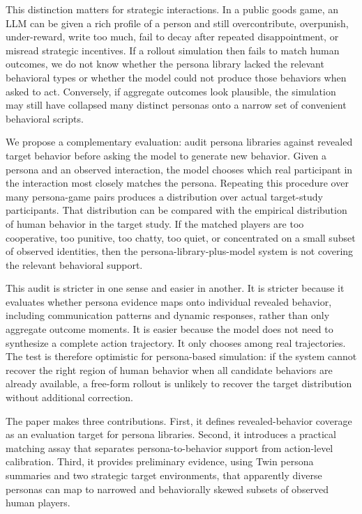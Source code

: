 \documentclass[11pt]{article}
\begin{document}
This distinction matters for strategic interactions. In a public goods game, an LLM can be given a rich profile of a person and still overcontribute, overpunish, under-reward, write too much, fail to decay after repeated disappointment, or misread strategic incentives. If a rollout simulation then fails to match human outcomes, we do not know whether the persona library lacked the relevant behavioral types or whether the model could not produce those behaviors when asked to act. Conversely, if aggregate outcomes look plausible, the simulation may still have collapsed many distinct personas onto a narrow set of convenient behavioral scripts.

We propose a complementary evaluation: audit persona libraries against revealed target behavior before asking the model to generate new behavior. Given a persona and an observed interaction, the model chooses which real participant in the interaction most closely matches the persona. Repeating this procedure over many persona-game pairs produces a distribution over actual target-study participants. That distribution can be compared with the empirical distribution of human behavior in the target study. If the matched players are too cooperative, too punitive, too chatty, too quiet, or concentrated on a small subset of observed identities, then the persona-library-plus-model system is not covering the relevant behavioral support.

This audit is stricter in one sense and easier in another. It is stricter because it evaluates whether persona evidence maps onto individual revealed behavior, including communication patterns and dynamic responses, rather than only aggregate outcome moments. It is easier because the model does not need to synthesize a complete action trajectory. It only chooses among real trajectories. The test is therefore optimistic for persona-based simulation: if the system cannot recover the right region of human behavior when all candidate behaviors are already available, a free-form rollout is unlikely to recover the target distribution without additional correction.

The paper makes three contributions. First, it defines revealed-behavior coverage as an evaluation target for persona libraries. Second, it introduces a practical matching assay that separates persona-to-behavior support from action-level calibration. Third, it provides preliminary evidence, using Twin persona summaries and two strategic target environments, that apparently diverse personas can map to narrowed and behaviorally skewed subsets of observed human players.
\end{document}
